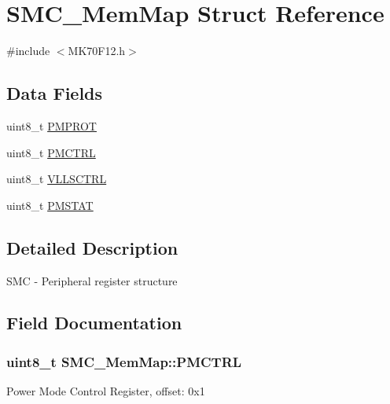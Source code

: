 \hypertarget{struct_s_m_c___mem_map}{}\section{S\+M\+C\+\_\+\+Mem\+Map Struct Reference}
\label{struct_s_m_c___mem_map}


{\ttfamily \#include $<$M\+K70\+F12.\+h$>$}

\subsection*{Data Fields}
\begin{DoxyCompactItemize}
\item 
uint8\+\_\+t \hyperlink{struct_s_m_c___mem_map_afd03d93a7823dc65f53216dca15a2a95}{P\+M\+P\+R\+O\+T}
\item 
uint8\+\_\+t \hyperlink{struct_s_m_c___mem_map_a2a5d946bb55640fd179c4065937bea5c}{P\+M\+C\+T\+R\+L}
\item 
uint8\+\_\+t \hyperlink{struct_s_m_c___mem_map_ad5b37041739800b7bb7afc59d53c7ded}{V\+L\+L\+S\+C\+T\+R\+L}
\item 
uint8\+\_\+t \hyperlink{struct_s_m_c___mem_map_a0fddef87e229c4cf1b3be0d29589e964}{P\+M\+S\+T\+A\+T}
\end{DoxyCompactItemize}


\subsection{Detailed Description}
S\+M\+C -\/ Peripheral register structure 

\subsection{Field Documentation}
\hypertarget{struct_s_m_c___mem_map_a2a5d946bb55640fd179c4065937bea5c}{}
\subsubsection[{P\+M\+C\+T\+R\+L}]{\setlength{\rightskip}{0pt plus 5cm}uint8\+\_\+t S\+M\+C\+\_\+\+Mem\+Map\+::\+P\+M\+C\+T\+R\+L}\label{struct_s_m_c___mem_map_a2a5d946bb55640fd179c4065937bea5c}
Power Mode Control Register, offset\+: 0x1 \hypertarget{struct_s_m_c___mem_map_afd03d93a7823dc65f53216dca15a2a95}{}
